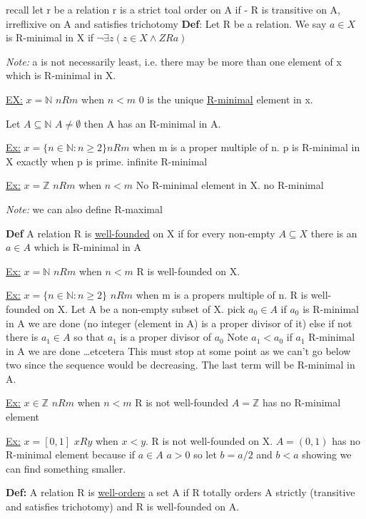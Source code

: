 \documentclass{article}
\begin{document}
    recall let r be a relation
    r is a strict toal order on A if - R is transitive on A, irreflixive on A and satisfies trichotomy
    \textbf{Def}: Let R be a relation. We say $a \in X$ is R-minimal in X if $\neg \exists z ( z \in X \wedge Z R a)$

    \emph{Note:}    a is not necessarily least, i.e. there may be more than one element of x which is R-minimal in X.

    \underline{EX:} $x=\mathbb{N}$ $n R m$ when $n<m$ 0 is the unique \underline{R-minimal} element in x.

    Let $A \subseteq \mathbb{N}$ $A \neq \emptyset$ then A has an R-minimal in A.

    \underline{Ex:} $x = \{ n \in \mathbb{N} : n \geq 2\} n R m$ when m is a proper multiple of n.
    p is R-minimal in X exactly when p is prime.
    infinite R-minimal

    \underline{Ex:} $x=\mathbb{Z}$ $n R m$ when $n < m$ No R-minimal element in X.
    no R-minimal

    \emph{Note:} we can also define R-maximal

    \textbf{Def} A relation R is \underline{well-founded} on X if for every non-empty $A \subseteq X$ there is an $a \in A$ which is R-minimal in A

    \underline{Ex:} $x=\mathbb{N}$ $n R m$ when $n < m$ R is well-founded on X.

    \underline{Ex:} $x = \{n \in \mathbb{N} : n \geq 2\}$ $n R m$ when m is a propers multiple of n.
    R is well-founded on X.
    Let A be a non-empty subset of X\@.
    pick $a_0 \in A$
    if $a_0$ is R-minimal in A we are done (no integer (element in A) is a proper divisor of it)
    else if not there is $a_1 \in A$ so that $a_1$ is a proper divisor of $a_0$
    Note $a_1 < a_0$
    if $a_1$ R-minimal in A we are done \dots etcetera
    This must stop at some point as we can't go below two since the sequence would be decreasing.
    The last term will be R-minimal in A.

    \underline{Ex:} $x \in \mathbb{Z}$ $n R m$ when $n < m$ R is not well-founded
    $A = \mathbb{Z}$ has no R-minimal element

    \underline{Ex:} $x=[0,1]$ $x R y$ when $x < y$.
    R is not well-founded on X.
    $A = (0,1)$ has no R-minimal element because if $a \in A$ $a>0$ so let $b=a/2$ and $b<a$ showing we can find something smaller.

    \textbf{Def:} A relation R is \underline{well-orders} a set A if R totally orders A strictly (transitive and satisfies trichotomy) and R is well-founded on A.
\end{document}
